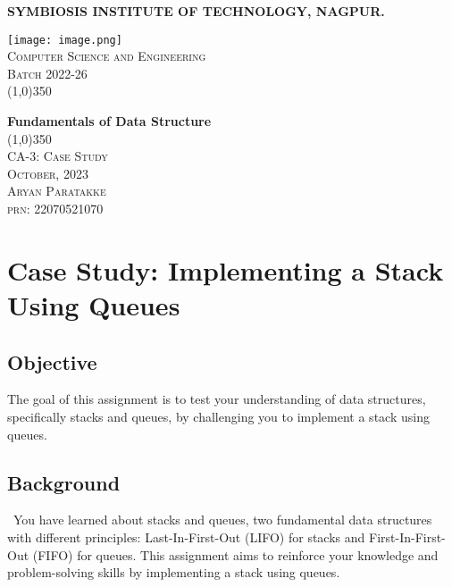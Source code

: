 \documentclass{article}
\begin{document}
    \begin{titlepage}
        \begin{center}
            \huge{\bfseries \textbf{SYMBIOSIS INSTITUTE OF TECHNOLOGY,  NAGPUR.}}\\ 
        [1.5cm]
            \begin{center}
                \texttt{[image: image.png]}\\
        [1.5cm] 
                \textsc{\huge{Computer Science and Engineering\\Batch 2022-26}}\\  
        [0.5cm]
                \line(1,0){350}\\
        [0.65cm]
            \end{center}   
        \huge{\bfseries Fundamentals of Data Structure}\\
        \line(1,0){350}\\
        [0.5cm]
            \textsc{\Large CA-3: Case Study}\\
            \textsc{\LARGE {October, 2023}}\\  
        [1.5cm]
            \textsc{\LARGE{Aryan Paratakke}}\\
            \textsc{\Large prn: 22070521070}\\
        \end{center}		
    \end{titlepage}

\tableofcontents %
\pagebreak

\section{Case Study: Implementing a Stack Using Queues}
    \subsection{Objective}
        The goal of this assignment is to test your understanding of data structures, specifically stacks and queues, by challenging you to implement a stack using queues.
        
    \subsection{Background}\
        You have learned about stacks and queues, two fundamental data structures with different principles: Last-In-First-Out (LIFO) for stacks and First-In-First-Out (FIFO) for queues. This assignment aims to reinforce your knowledge and problem-solving skills by implementing a stack using queues.
    
\end{document}
